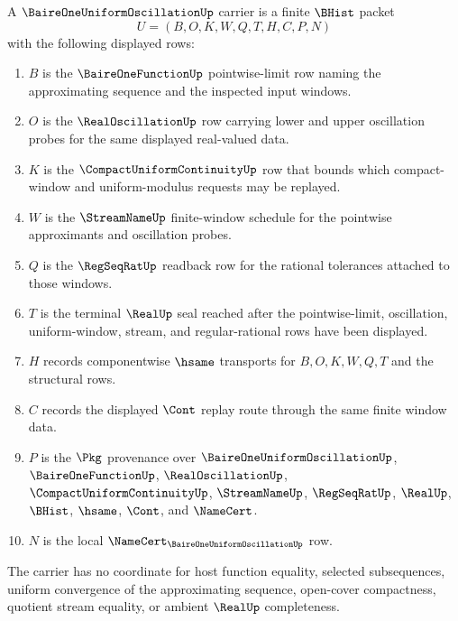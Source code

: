 \begin{definition}
\label{def:baire-one-uniform-oscillation-carrier}
A $\BaireOneUniformOscillationUp$ carrier is a finite $\BHist$ packet
$$
U=(B,O,K,W,Q,T,H,C,P,N)
$$
with the following displayed rows:
\begin{enumerate}
\item $B$ is the $\BaireOneFunctionUp$ pointwise-limit row naming the approximating sequence and the inspected input windows.
\item $O$ is the $\RealOscillationUp$ row carrying lower and upper oscillation probes for the same displayed real-valued data.
\item $K$ is the $\CompactUniformContinuityUp$ row that bounds which compact-window and uniform-modulus requests may be replayed.
\item $W$ is the $\StreamNameUp$ finite-window schedule for the pointwise approximants and oscillation probes.
\item $Q$ is the $\RegSeqRatUp$ readback row for the rational tolerances attached to those windows.
\item $T$ is the terminal $\RealUp$ seal reached after the pointwise-limit, oscillation, uniform-window, stream, and regular-rational rows have been displayed.
\item $H$ records componentwise $\hsame$ transports for $B,O,K,W,Q,T$ and the structural rows.
\item $C$ records the displayed $\Cont$ replay route through the same finite window data.
\item $P$ is the $\Pkg$ provenance over $\BaireOneUniformOscillationUp$, $\BaireOneFunctionUp$, $\RealOscillationUp$, $\CompactUniformContinuityUp$, $\StreamNameUp$, $\RegSeqRatUp$, $\RealUp$, $\BHist$, $\hsame$, $\Cont$, and $\NameCert$.
\item $N$ is the local $\NameCert_{\BaireOneUniformOscillationUp}$ row.
\end{enumerate}
The carrier has no coordinate for host function equality, selected subsequences, uniform convergence of the approximating sequence, open-cover compactness, quotient stream equality, or ambient $\RealUp$ completeness.
\end{definition}

